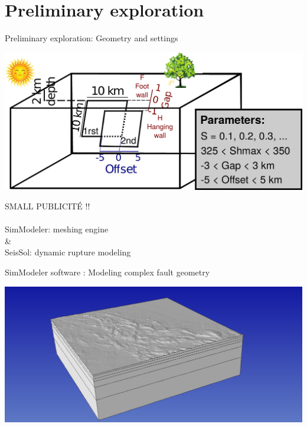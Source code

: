 \documentclass{beamer}
\begin{document}
\section{Preliminary exploration}

\begin{frame}
 {Preliminary exploration: Geometry and settings}
 
  \includegraphics[width=1\linewidth]{images/schematic_view_param_new}
 
 \hfill {\small \citep[www.seissol.org; e.g.,][]{Wollherr_2018_OFP, Ulrich_2019_CPB}}
 
\end{frame}


\begin{frame}
 
 \centering \huge SMALL PUBLICIT\'E !!
 \\ \ \\
 SimModeler: meshing engine
 \\
 \&
 \\ 
 SeisSol: dynamic rupture modeling
 
 
\end{frame}



\begin{frame}
 {SimModeler software : Modeling complex fault geometry}
 
 \includegraphics[width=1\linewidth]{images/simmodeler1}
 
\end{frame}
\end{document}
